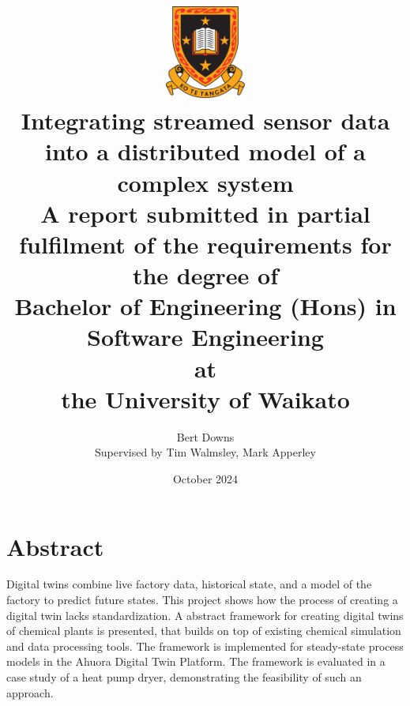 \documentclass[12pt]{report}
\title{ \includegraphics[width=0.2\textwidth]{uow_logo.png} \\
Integrating streamed sensor data into a distributed model of a complex system \\
\large{A report submitted in partial fulfilment of the requirements for the degree of \\
\textbf{Bachelor of Engineering (Hons) in Software Engineering} \\
at \\
\textbf{the University of Waikato}\\
}}
\author{Bert Downs  \\ 
Supervised by Tim Walmsley, Mark Apperley }
\date{October 2024}
\begin{document}


\maketitle


\chapter*{Abstract}

Digital twins combine live factory data, historical state, and a model of the factory to predict future states. This project shows how the process of creating a digital twin lacks standardization. A abstract framework for creating digital twins of chemical plants is presented, that builds on top of existing chemical simulation and data processing tools. The framework is implemented for steady-state process models in the Ahuora Digital Twin Platform. The framework is evaluated in a case study of a heat pump dryer, demonstrating the feasibility of such an approach.
\end{document}
